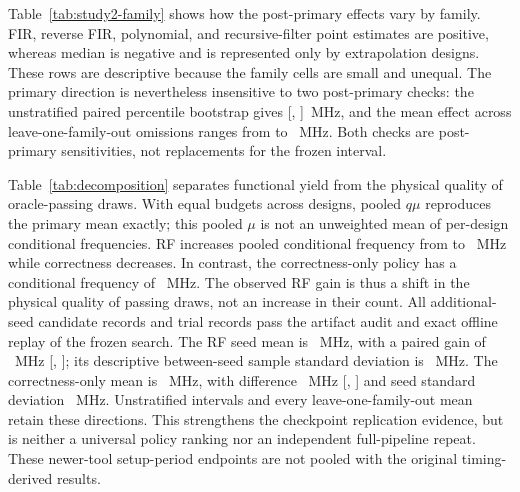 

Table~\ref{tab:study2-family} shows how the post-primary effects vary by family.  FIR, reverse FIR, polynomial, and recursive-filter
point estimates are positive, whereas median is negative and is represented
only by extrapolation designs.  These rows are descriptive because the family
cells are small and unequal.  The primary direction is nevertheless insensitive
to two post-primary checks: the unstratified paired percentile
bootstrap gives
[,
]~MHz, and the mean effect
across leave-one-family-out omissions ranges from
 to
~MHz.  Both checks are post-
primary sensitivities, not replacements for the frozen interval.


Table~\ref{tab:decomposition} separates functional yield from the physical
quality of oracle-passing draws.  With equal budgets across designs, pooled
$q\mu$ reproduces the primary mean exactly; this pooled $\mu$ is not an
unweighted mean of per-design conditional frequencies.  RF increases pooled
conditional frequency from  to
~MHz while correctness decreases.  In contrast,
the correctness-only policy has a conditional frequency of
~MHz.  The observed RF gain is thus a
shift in the physical quality of passing draws, not an increase in their count.
All  additional-seed candidate records and
 trial records pass the artifact audit and exact
offline replay of the frozen search. The RF seed mean is
~MHz, with a paired gain of
~MHz
[, ]; its descriptive
between-seed sample standard deviation is ~MHz.
The correctness-only mean is ~MHz, with difference
~MHz
[, ] and seed standard
deviation ~MHz.  Unstratified intervals and every
leave-one-family-out mean retain these directions.  This strengthens the
checkpoint replication evidence, but is neither a universal policy ranking nor
an independent full-pipeline repeat.  These newer-tool setup-period endpoints
are not pooled with the original timing-derived results.
